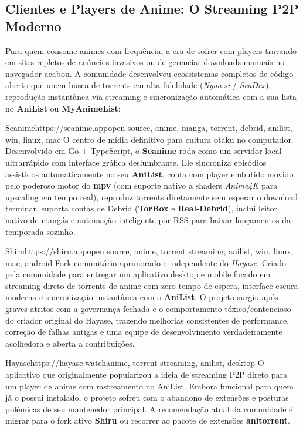 \documentclass{pousadaguide}
\begin{document}
\subsection{Clientes e Players de Anime: O Streaming P2P Moderno}

Para quem consome animes com frequência, a era de sofrer com players travando em sites repletos de anúncios invasivos ou de gerenciar downloads manuais no navegador acabou. A comunidade desenvolveu ecossistemas completos de código aberto que unem busca de torrents em alta fidelidade (\emph{Nyaa.si} / \emph{SeaDex}), reprodução instantânea via streaming e sincronização automática com a sua lista no \textbf{AniList} ou \textbf{MyAnimeList}:

\begin{ferramenta}[goat,logo=seanime]{Seanime}{https://seanime.app}{open source, anime, manga, torrent, debrid, anilist, win, linux, mac}
O centro de mídia definitivo para cultura otaku no computador. Desenvolvido em Go + TypeScript, o \textbf{Seanime} roda como um servidor local ultrarrápido com interface gráfica deslumbrante. Ele sincroniza episódios assistidos automaticamente no seu \textbf{AniList}, conta com player embutido movido pelo poderoso motor do \textbf{mpv} (com suporte nativo a shaders \emph{Anime4K} para upscaling em tempo real), reproduz torrents diretamente sem esperar o download terminar, suporta contas de Debrid (\textbf{TorBox} e \textbf{Real-Debrid}), inclui leitor nativo de mangás e automação inteligente por RSS para baixar lançamentos da temporada sozinho. 
\end{ferramenta}

\begin{ferramenta}[goat,logo=shiru]{Shiru}{https://shiru.app}{open source, anime, torrent streaming, anilist, win, linux, mac, android}
Fork comunitário aprimorado e independente do \emph{Hayase}. Criado pela comunidade para entregar um aplicativo desktop e mobile focado em streaming direto de torrents de anime com zero tempo de espera, interface escura moderna e sincronização instantânea com o \textbf{AniList}. O projeto surgiu após graves atritos com a governança fechada e o comportamento tóxico/contencioso do criador original do Hayase, trazendo melhorias consistentes de performance, correção de falhas antigas e uma equipe de desenvolvimento verdadeiramente acolhedora e aberta a contribuições. 
\end{ferramenta}

\begin{ferramenta}[logo=hayase]{Hayase}{https://hayase.watch}{anime, torrent streaming, anilist, desktop}
O aplicativo que originalmente popularizou a ideia de streaming P2P direto para um player de anime com rastreamento no AniList. Embora funcional para quem já o possui instalado, o projeto sofreu com o abandono de extensões e posturas polêmicas de seu mantenedor principal. A recomendação atual da comunidade é migrar para o fork ativo \textbf{Shiru} ou recorrer ao pacote de extensões \textbf{anitorrent}. 
\end{ferramenta}
\end{document}
